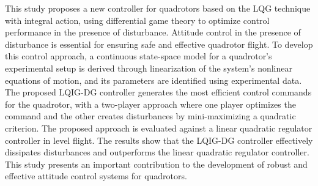 \documentclass[3p,times]{elsarticle}
\begin{document}
This study proposes a new controller for quadrotors based on the LQG technique with integral action, using differential game theory to optimize control performance in the presence of disturbance. Attitude control in the presence of disturbance is essential for ensuring safe and effective quadrotor flight. To develop this control approach, a continuous state-space model for a quadrotor's experimental setup is derived through linearization of the system's nonlinear equations of motion, and its parameters are identified using experimental data. The proposed LQIG-DG controller generates the most efficient control commands for the quadrotor, with a two-player approach where one player optimizes the command and the other creates disturbances by mini-maximizing a quadratic criterion. The proposed approach is evaluated against a linear quadratic regulator controller in level flight. The results show that the LQIG-DG controller effectively dissipates disturbances and outperforms the linear quadratic regulator controller. This study presents an important contribution to the development of robust and effective attitude control systems for quadrotors.



\end{document}
